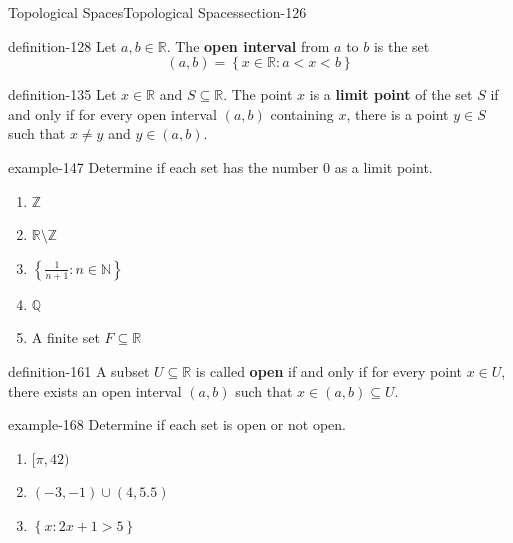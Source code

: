 \documentclass[oneside,10pt,]{article}
\newcommand{\terminology}[1]{\textbf{#1}}
\newcommand{\mb}{\mathbb}
\newcommand{\setBuilder}[2]{\left\{#1:#2\right\}}
\newcommand{\lt}{<}
\begin{document}
%
%
\typeout{************************************************}
\typeout{************************************************}
%
\begin{sectionptx}{Topological Spaces}{}{Topological Spaces}{}{}{section-126}
\begin{definition}{}{definition-128}%
\hypertarget{p-129}{}%
Let \(a,b\in\mb R\). The \terminology{open interval} from \(a\) to \(b\) is the set%
%
\begin{equation*}
(a,b)=\setBuilder{x\in\mb R}{a\lt x\lt b}
\end{equation*}
\end{definition}
\begin{definition}{}{definition-135}%
\hypertarget{p-136}{}%
Let \(x\in\mb R\) and \(S\subseteq\mb R\). The point \(x\) is a \terminology{limit point} of the set \(S\) if and only if for every open interval \((a,b)\) containing \(x\), there is a point \(y\in S\) such that \(x\not=y\) and \(y\in(a,b)\).%
\end{definition}
\begin{example}{}{example-147}%
\hypertarget{p-148}{}%
Determine if each set has the number \(0\) as a limit point.%
\leavevmode%
\begin{enumerate}
\item\hypertarget{li-151}{}\(\mb Z\)%
\item\hypertarget{li-153}{}\(\mb R\setminus\mb Z\)%
\item\hypertarget{li-155}{}\(\setBuilder{\frac{1}{n+1}}{n\in\mb N}\)%
\item\hypertarget{li-157}{}\(\mb Q\)%
\item\hypertarget{li-159}{}A finite set \(F\subseteq\mb R\)%
\end{enumerate}
\end{example}
\begin{definition}{}{definition-161}%
\hypertarget{p-162}{}%
A subset \(U\subseteq\mb R\) is called \terminology{open} if and only if for every point \(x\in U\), there exists an open interval \((a,b)\) such that \(x\in(a,b)\subseteq U\).%
\end{definition}
\begin{example}{}{example-168}%
\hypertarget{p-169}{}%
Determine if each set is open or not open.%
\leavevmode%
\begin{enumerate}
\item\hypertarget{li-171}{}\([\pi,42)\)%
\item\hypertarget{li-173}{}\((-3,-1)\cup(4,5.5)\)%
\item\hypertarget{li-175}{}\(\setBuilder{x}{2x+1>5}\)%

\end{enumerate}
\end{example}
\end{sectionptx}
\end{document}

